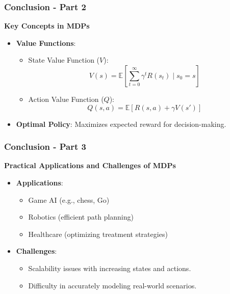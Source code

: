 \documentclass[aspectratio=169]{beamer}
\begin{document}
\begin{frame}[fragile]
    \frametitle{Conclusion - Part 2}
    \textbf{Key Concepts in MDPs}
    
    \begin{itemize}
        \item \textbf{Value Functions}:
        \begin{itemize}
            \item State Value Function (\(V\)):
            \begin{equation}
            V(s) = \mathbb{E} \left[ \sum_{t=0}^{\infty} \gamma^t R(s_t) \mid s_0 = s \right]
            \end{equation}
            \item Action Value Function (\(Q\)):
            \begin{equation}
            Q(s, a) = \mathbb{E} \left[ R(s, a) + \gamma V(s') \right]
            \end{equation}
        \end{itemize}
        \item \textbf{Optimal Policy}: Maximizes expected reward for decision-making.
    \end{itemize}
\end{frame}

\begin{frame}[fragile]
    \frametitle{Conclusion - Part 3}
    \textbf{Practical Applications and Challenges of MDPs}
    
    \begin{itemize}
        \item \textbf{Applications}:
        \begin{itemize}
            \item Game AI (e.g., chess, Go)
            \item Robotics (efficient path planning)
            \item Healthcare (optimizing treatment strategies)
        \end{itemize}
        
        \item \textbf{Challenges}:
        \begin{itemize}
            \item Scalability issues with increasing states and actions.
            \item Difficulty in accurately modeling real-world scenarios.
        \end{itemize}
    \end{itemize}
\end{frame}
\end{document}
